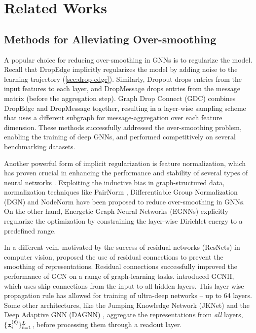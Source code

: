 \section{Related Works}
\label{sec:related}

\subsection{Methods for Alleviating Over-smoothing}

A popular choice for reducing over-smoothing in GNNs is to regularize the model. Recall that DropEdge \citep{rong2020dropedge} implicitly regularizes the model by adding noise to the learning trajectory (\autoref{sec:drop-edge}). Similarly, Dropout \cite{srivastava2014dropout} drops entries from the input features to each layer, and DropMessage \citep{Fang2022DropMessageUR} drops entries from the message matrix (before the aggregation step). Graph Drop Connect (GDC) \citep{hasanzadeh2020bayesian} combines DropEdge and DropMessage together, resulting in a layer-wise sampling scheme that uses a different subgraph for message-aggregation over each feature dimension. These methods successfully addressed the over-smoothing problem, enabling the training of deep GNNs, and performed competitively on several benchmarking datasets.

Another powerful form of implicit regularization is feature normalization, which has proven crucial in enhancing the performance and stability of several types of neural networks \citep{huang2020normalizationtechniquestrainingdnns}. Exploiting the inductive bias in graph-structured data, normalization techniques like PairNorm \citep{Zhao2020PairNorm}, Differentiable Group Normalization (DGN) \citep{zhou2020towards} and NodeNorm \citep{zhou2021understanding} have been proposed to reduce over-smoothing in GNNs. On the other hand, Energetic Graph Neural Networks (EGNNs) \cite{zhou2021dirichlet} explicitly regularize the optimization by constraining the layer-wise Dirichlet energy to a predefined range.

In a different vein, motivated by the success of residual networks (ResNets) \citep{he_2016_residual} in computer vision, \cite{li2019point-clouds} proposed the use of residual connections to prevent the smoothing of representations. Residual connections successfully improved the performance of GCN on a range of graph-learning tasks. \cite{chen20vsimpledeep} introduced GCNII, which uses skip connections from the input to all hidden layers. This layer wise propagation rule has allowed for training of ultra-deep networks -- up to 64 layers. Some other architectures, like the Jumping Knowledge Network (JKNet) \cite{xu2018jknet} and the Deep Adaptive GNN (DAGNN) \cite{liu2020towards}, aggregate the representations from \textit{all} layers, $\{\bm{z}^{\left(\ell\right)}_i\}_{\ell=1}^L$, before processing them through a readout layer.

